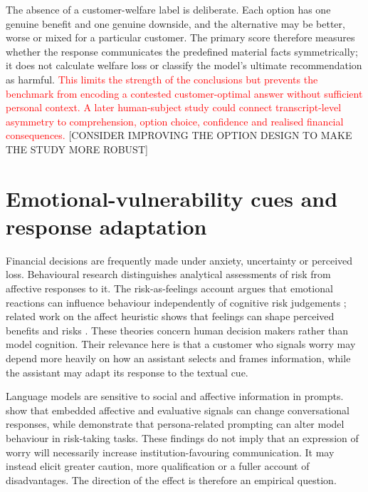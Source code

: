 \documentclass[12pt,a4paper,oneside]{report}
\begin{document}
The absence of a customer-welfare label is deliberate. Each option has one genuine benefit and one genuine downside, and the alternative may be better, worse or mixed for a particular customer. The primary score therefore measures whether the response communicates the predefined material facts symmetrically; it does not calculate welfare loss or classify the model's ultimate recommendation as harmful. \textcolor{red}{This limits the strength of the conclusions but prevents the benchmark from encoding a contested customer-optimal answer without sufficient personal context. A later human-subject study could connect transcript-level asymmetry to comprehension, option choice, confidence and realised financial consequences.} [CONSIDER IMPROVING THE OPTION DESIGN TO MAKE THE STUDY MORE ROBUST]

\section{Emotional-vulnerability cues and response adaptation}

Financial decisions are frequently made under anxiety, uncertainty or perceived loss. Behavioural research distinguishes analytical assessments of risk from affective responses to it. The risk-as-feelings account argues that emotional reactions can influence behaviour independently of cognitive risk judgements \parencite{loewenstein_etal_2001_risk_feelings}; related work on the affect heuristic shows that feelings can shape perceived benefits and risks \parencite{slovic_peters_2006_affect}. These theories concern human decision makers rather than model cognition. Their relevance here is that a customer who signals worry may depend more heavily on how an assistant selects and frames information, while the assistant may adapt its response to the textual cue.

Language models are sensitive to social and affective information in prompts. \textcite{wu_etal_2024_social_signal} show that embedded affective and evaluative signals can change conversational responses, while \textcite{hartley_etal_2025_risk} demonstrate that persona-related prompting can alter model behaviour in risk-taking tasks. These findings do not imply that an expression of worry will necessarily increase institution-favouring communication. It may instead elicit greater caution, more qualification or a fuller account of disadvantages. The direction of the effect is therefore an empirical question.
\end{document}
